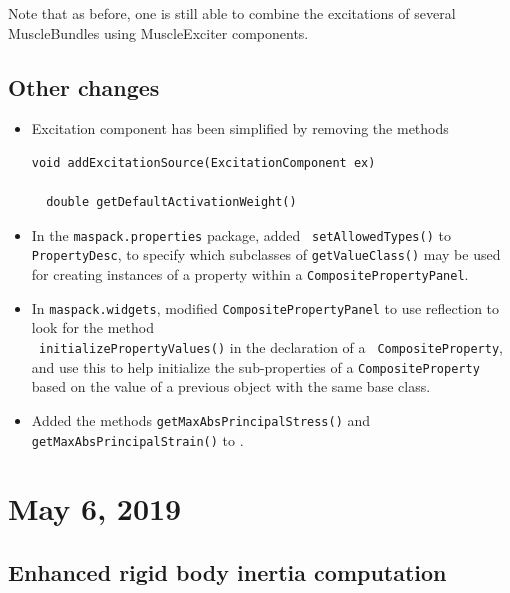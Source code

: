 \documentclass{article}
\begin{document}
Note that as before, one is still able to combine the excitations of
several MuscleBundles using MuscleExciter components.

\subsection*{Other changes}

\begin{itemize}

\item Excitation component has been simplified by removing the methods
%
\begin{lstlisting}[]
  void addExcitationSource(ExcitationComponent ex)

  double getDefaultActivationWeight()
\end{lstlisting}
%

\item In the {\tt maspack.properties} package, added {\tt
setAllowedTypes()} to {\tt PropertyDesc}, to specify which subclasses
of {\tt getValueClass()} may be used for creating instances of a
property within a {\tt CompositePropertyPanel}.

\item In {\tt maspack.widgets}, modified {\tt CompositePropertyPanel}
to use reflection to look for the method \\ {\tt
initializePropertyValues()} in the declaration of a {\tt
CompositeProperty}, and use this to help initialize the sub-properties
of a {\tt CompositeProperty} based on the value of a previous
object with the same base class.

\item Added the methods {\tt getMaxAbsPrincipalStress()} and {\tt
getMaxAbsPrincipalStrain()} to
.

\end{itemize}

\section*{May 6, 2019}

\subsection*{Enhanced rigid body inertia computation}
\end{document}
